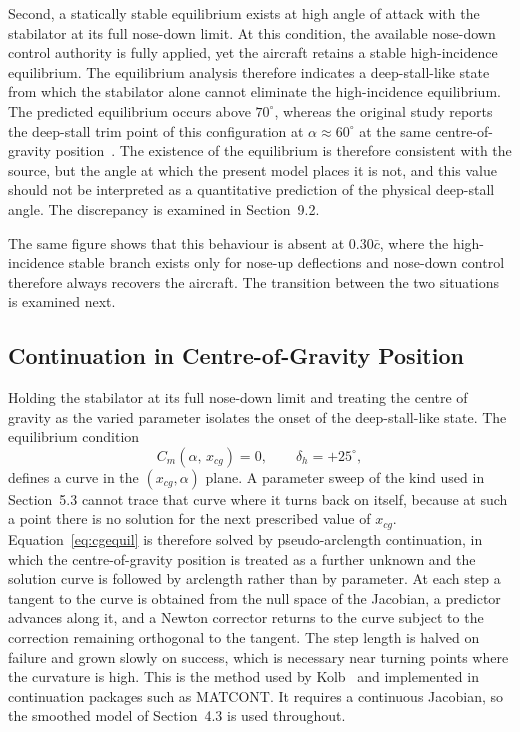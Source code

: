 \documentclass[
bindingoffset=5mm,  %
footnoteindent=3mm, %
hyphenation=true    %
]{src/wut-thesis}
\begin{document}
Second, a statically stable equilibrium exists at high angle of attack with the stabilator at its full nose-down limit. At this condition, the available nose-down control authority is fully applied, yet the aircraft retains a stable high-incidence equilibrium. The equilibrium analysis therefore indicates a deep-stall-like state from which the stabilator alone cannot eliminate the high-incidence equilibrium. 
The predicted equilibrium occurs above $70^{\circ}$, whereas the original
study reports the deep-stall trim point of this configuration at
$\alpha \approx 60^{\circ}$ at the same centre-of-gravity
position~\cite{nguyen1979}. The existence of the equilibrium is therefore
consistent with the source, but the angle at which the present model places it
is not, and this value should not be interpreted as a quantitative prediction
of the physical deep-stall angle. The discrepancy is examined in
Section~9.2.

 
 The same figure shows that this behaviour is absent at $0.30\bar{c}$, where
 the high-incidence stable branch exists only for nose-up deflections and
 nose-down control therefore always recovers the aircraft. The transition
 between the two situations is examined next.
 

\subsection{Continuation in Centre-of-Gravity Position}

Holding the stabilator at its full nose-down limit and treating the centre of
gravity as the varied parameter isolates the onset of the deep-stall-like
state. The equilibrium condition
\begin{equation}
	C_{m}\!\left(\alpha,\,x_{cg}\right) = 0,
	\qquad \delta_{h} = +25^{\circ},
	\label{eq:cgequil}
\end{equation}
defines a curve in the $(x_{cg},\alpha)$ plane. A parameter sweep of the kind
used in Section~5.3 cannot trace that curve where it turns back on itself,
because at such a point there is no solution for the next prescribed value of
$x_{cg}$. Equation~\eqref{eq:cgequil} is therefore solved by pseudo-arclength
continuation, in which the centre-of-gravity position is treated as a further
unknown and the solution curve is followed by arclength rather than by
parameter. At each step a tangent to the curve is obtained from the null space
of the Jacobian, a predictor advances along it, and a Newton corrector returns
to the curve subject to the correction remaining orthogonal to the tangent.
The step length is halved on failure and grown slowly on success, which is
necessary near turning points where the curvature is high. This is the method
used by Kolb~\cite{kolb2017} and implemented in continuation packages such as
MATCONT. It requires a continuous Jacobian, so the smoothed model of
Section~4.3 is used throughout.
\end{document}
